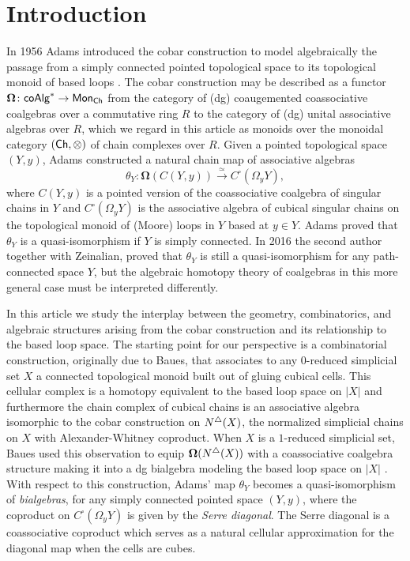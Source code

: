 
\section{Introduction}

In 1956 Adams introduced the cobar construction to model algebraically the passage from a simply connected pointed topological space to its topological monoid of based loops \cite{Adams}. The cobar construction may be described as a functor $\mathbf{\Omega} \colon \mathsf{coAlg}^* \to \mathsf{Mon}_{\mathsf{Ch}}$ from the category of (dg) coaugemented coassociative coalgebras over a commutative ring $R$ to the category of (dg) unital associative algebras over $R$, which we regard in this article as monoids over the monoidal category $(\mathsf{Ch}, \otimes) $ of chain complexes over $R$. Given a pointed topological space $(Y,y)$, Adams constructed a natural chain map of associative algebras
$$\theta_Y \colon \mathbf{\Omega}(C(Y,y)) \xrightarrow{\simeq} C^{\square}(\Omega_yY),$$ where $C(Y,y)$ is a pointed version of the coassociative coalgebra of singular chains in $Y$ and $C^{\square}(\Omega_yY)$ is the associative algebra of cubical singular chains on the topological monoid of (Moore) loops in $Y$ based at $y \in Y$. Adams proved that $\theta_Y$ is a quasi-isomorphism if $Y$ is simply connected. In 2016 the second author together with Zeinalian, proved that $\theta_Y$ is still a quasi-isomorphism for any path-connected space $Y$, but the algebraic homotopy theory of coalgebras in this more general case must be interpreted differently.

In this article we study the interplay between the geometry, combinatorics, and algebraic structures arising from the cobar construction and its relationship to the based loop space. The starting point for our perspective is a combinatorial construction, originally due to Baues, that associates to any $0$-reduced simplicial set $X$ a connected topological monoid built out of gluing cubical cells.  This cellular complex is a homotopy equivalent to the based loop space on $|X|$ and furthermore the chain complex of cubical chains is an associative algebra isomorphic to the cobar construction on $N^{\triangle}(X)$, the normalized simplicial chains on $X$ with Alexander-Whitney coproduct. When $X$ is a $1$-reduced simplicial set, Baues used this observation to equip $\mathbf{\Omega}( N^{\triangle} (X) )$ with a coassociative coalgebra structure making it into a dg bialgebra modeling the based loop space on $|X|$ \cite{Baues}.  With respect to this construction, Adams' map $\theta_Y$ becomes a quasi-isomorphism of \textit{bialgebras}, for any simply connected pointed space $(Y,y)$, where the coproduct on $C^{\square}(\Omega_yY)$ is given by the \textit{Serre diagonal}. The Serre diagonal is a coassociative coproduct which serves as a natural cellular approximation for the diagonal map when the cells are cubes. 

